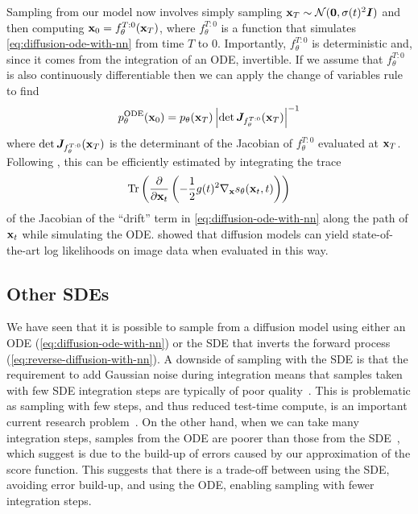 Sampling from our model now involves simply sampling ${\mathbf{x}}_T \sim {\mathcal{N}}({\bm{0}}, \sigma(t)^2{\bm{I}})$ and then computing ${\mathbf{x}}_0 = f^{T:0}_\theta({\mathbf{x}}_T)$, where $f^{T:0}_\theta$ is a function that simulates \cref{eq:diffusion-ode-with-nn} from time $T$ to $0$. Importantly, $f^{T:0}_\theta$ is deterministic and, since it comes from the integration of an ODE, invertible. If we assume that $f^{T:0}_\theta$ is also continuously differentiable then we can apply the change of variables rule to find
\begin{equation}
    p_\theta^\text{ODE}({\mathbf{x}}_0) = p_\theta({\mathbf{x}}_T) \left| \det {\bm{J}}_{f^{T:0}_\theta}({\mathbf{x}}_T) \right|^{-1}
\end{equation}
where $\det {\bm{J}}_{f^{T:0}_\theta}({\mathbf{x}}_T)$ is the determinant of the Jacobian of $f^{T:0}_\theta$ evaluated at ${\mathbf{x}}_T$. Following \citet{chen2018neural}, this can be efficiently estimated by integrating the trace
\begin{equation}
    \text{Tr}\left( \frac{\partial}{\partial {\mathbf{x}}_t} \left( - \frac{1}{2} g(t)^2 \nabla_{\mathbf{x}} s_\theta({\mathbf{x}}_t, t) \right)
    \right)
\end{equation}
of the Jacobian of the ``drift'' term in \cref{eq:diffusion-ode-with-nn} along the path of ${\mathbf{x}}_t$ while simulating the ODE. \citet{song2020score} showed that diffusion models can yield state-of-the-art log likelihoods on image data when evaluated in this way.

\subsection{Other SDEs}
We have seen that it is possible to sample from a diffusion model using either an ODE (\cref{eq:diffusion-ode-with-nn}) or the SDE that inverts the forward process (\cref{eq:reverse-diffusion-with-nn}). A downside of sampling with the SDE is that the requirement to add Gaussian noise during integration means that samples taken with few SDE integration steps are typically of poor quality~\citep{song2020denoising,karras2022elucidating}. This is problematic as sampling with few steps, and thus reduced test-time compute, is an important current research problem~\citep{salimans2022progressive,meng2022distillation,esser2024scaling}. On the other hand, when we can take many integration steps, samples from the ODE are poorer than those from the SDE~\citep{song2020denoising}, which \citep{karras2022elucidating} suggest is due to the build-up of errors caused by our approximation of the score function. This suggests that there is a trade-off between using the SDE, avoiding error build-up, and using the ODE, enabling sampling with fewer integration steps.

